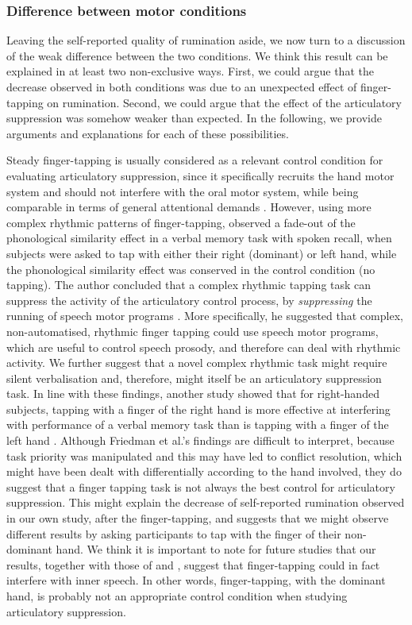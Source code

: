 \documentclass[12pt,]{book}
\theoremstyle{definition}
\theoremstyle{definition}
\theoremstyle{definition}
\theoremstyle{remark}
\begin{document}
\subsubsection{Difference between motor
conditions}\label{difference-between-motor-conditions}

Leaving the self-reported quality of rumination aside, we now turn to a
discussion of the weak difference between the two conditions. We think
this result can be explained in at least two non-exclusive ways. First,
we could argue that the decrease observed in both conditions was due to
an unexpected effect of finger-tapping on rumination. Second, we could
argue that the effect of the articulatory suppression was somehow weaker
than expected. In the following, we provide arguments and explanations
for each of these possibilities.

Steady finger-tapping is usually considered as a relevant control
condition for evaluating articulatory suppression, since it specifically
recruits the hand motor system and should not interfere with the oral
motor system, while being comparable in terms of general attentional
demands \citep[e.g.,][]{Gruber2001, Logie1987}. However, using more
complex rhythmic patterns of finger-tapping, \citet{Saito1994} observed
a fade-out of the phonological similarity effect in a verbal memory task
with spoken recall, when subjects were asked to tap with either their
right (dominant) or left hand, while the phonological similarity effect
was conserved in the control condition (no tapping). The author
concluded that a complex rhythmic tapping task can suppress the activity
of the articulatory control process, by \emph{suppressing} the running
of speech motor programs \citep[page 185]{Saito1994}. More specifically,
he suggested that complex, non-automatised, rhythmic finger tapping
could use speech motor programs, which are useful to control speech
prosody, and therefore can deal with rhythmic activity. We further
suggest that a novel complex rhythmic task might require silent
verbalisation and, therefore, might itself be an articulatory
suppression task. In line with these findings, another study showed that
for right-handed subjects, tapping with a finger of the right hand is
more effective at interfering with performance of a verbal memory task
than is tapping with a finger of the left hand \citep{Friedman1988}.
Although Friedman et al.'s findings are difficult to interpret, because
task priority was manipulated and this may have led to conflict
resolution, which might have been dealt with differentially according to
the hand involved, they do suggest that a finger tapping task is not
always the best control for articulatory suppression. This might explain
the decrease of self-reported rumination observed in our own study,
after the finger-tapping, and suggests that we might observe different
results by asking participants to tap with the finger of their
non-dominant hand. We think it is important to note for future studies
that our results, together with those of \citet{Saito1994} and
\citet{Friedman1988}, suggest that finger-tapping could in fact
interfere with inner speech. In other words, finger-tapping, with the
dominant hand, is probably not an appropriate control condition when
studying articulatory suppression.
\end{document}
